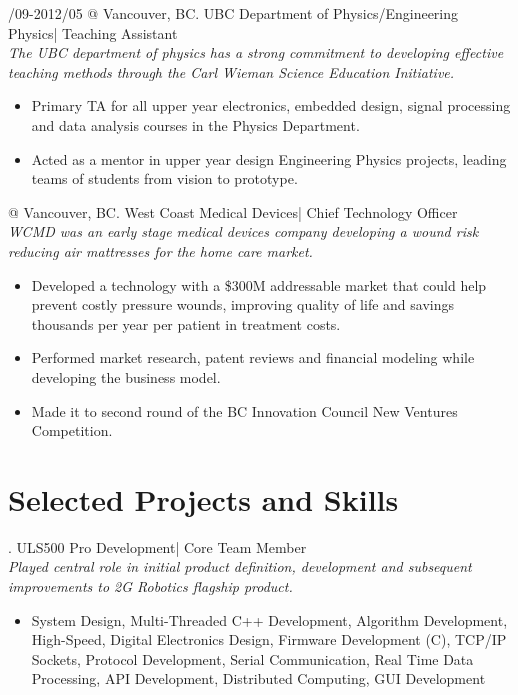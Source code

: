 \documentclass[10pt,letterpaper]{resume}
\begin{document}
/09-2012/05 @ Vancouver, BC. UBC Department of Physics/Engineering Physics| Teaching Assistant
\textit{\\The UBC department of physics has a strong commitment to developing effective teaching methods through the Carl Wieman Science Education Initiative.}
\begin{itemize}
\item Primary TA for all upper year electronics, embedded design, signal processing and data analysis courses in the Physics Department.
\item Acted as a mentor in upper year design Engineering Physics projects, leading teams of students from vision to prototype.
\end{itemize}

 @ Vancouver, BC. West Coast Medical Devices| Chief Technology Officer
\textit{\\WCMD was an early stage medical devices company developing a wound risk reducing air mattresses for the home care market.}
\begin{itemize}
\item Developed a technology with a \$300M addressable market that could help prevent costly pressure wounds, improving quality of life and savings thousands per year per patient in treatment costs.
\item Performed market research, patent reviews and financial modeling while developing the business model.
\item Made it to second round of the BC Innovation Council New Ventures Competition.
\end{itemize}


\section{Selected Projects and Skills}

\entry  . ULS500 Pro Development| Core Team Member
\textit{\\Played central role in initial product definition, development and subsequent improvements to 2G Robotics flagship product.}
\begin {itemize}
\item System Design, Multi-Threaded C++ Development, Algorithm Development, High-Speed, Digital Electronics Design, Firmware Development (C), TCP/IP Sockets, Protocol Development, Serial Communication, Real Time Data Processing, API Development, Distributed Computing, GUI Development
\end {itemize}
\end{document}
